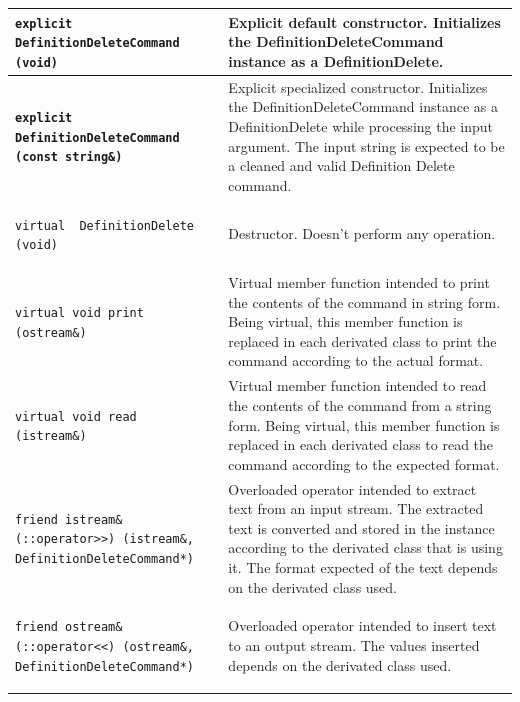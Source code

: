 \documentclass[11pt,twoside,openany,x11names,svgnames]{memoir}
\begin{document}
\begin{table}[h]\footnotesize
\centering
\begin{tabular}{| >{\bfseries}p{7.5cm} | p{8cm} |}
	\hline
	
	\texttt{explicit DefinitionDeleteCommand (void)} & Explicit default constructor. Initializes the DefinitionDeleteCommand instance as a DefinitionDelete. \\
	
	\hline
	
	\texttt{explicit DefinitionDeleteCommand (const string\&)} & Explicit specialized constructor. Initializes the DefinitionDeleteCommand instance as a DefinitionDelete while processing the input argument. The input string is expected to be a cleaned and valid Definition Delete command. \\
	
	\hline
	
	\texttt{virtual ~DefinitionDelete (void)} & Destructor. Doesn't perform any operation. \\
	
	\hline
	
	\texttt{virtual void print (ostream\&)} & Virtual member function intended to print the contents of the command in string form. Being virtual, this member function is replaced in each derivated class to print the command according to the actual format. \\
	
	\hline
	
	\texttt{virtual void read (istream\&)} & Virtual member function intended to read the contents of the command from a string form. Being virtual, this member function is replaced in each derivated class to read the command according to the expected format. \\
	
	\hline	
		
	\texttt{friend istream\& (::operator>>) (istream\&, DefinitionDeleteCommand*)} & Overloaded operator intended to extract text from an input stream. The extracted text is converted and stored in the instance according to the derivated class that is using it. The format expected of the text depends on the derivated class used. \\
	
	\hline
	
	\texttt{friend ostream\& (::operator<<) (ostream\&, DefinitionDeleteCommand*)} & Overloaded operator intended to insert text to an output stream. The values inserted depends on the derivated class used. \\
	

\end{tabular}
\end{table}
\end{document}
